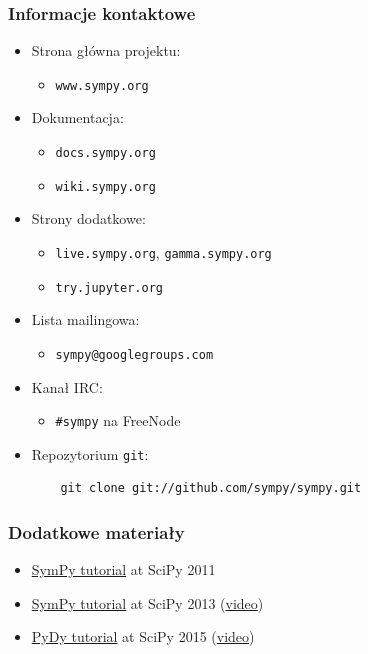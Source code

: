 \documentclass[10pt]{beamer}
\begin{document}
\begin{frame}[fragile]
  \frametitle{Informacje kontaktowe}

  \begin{itemize}
    \item Strona główna projektu:
      \begin{itemize}
        \item \texttt{www.sympy.org}
      \end{itemize}
    \item Dokumentacja:
      \begin{itemize}
        \item \texttt{docs.sympy.org}
        \item \texttt{wiki.sympy.org}
      \end{itemize}
    \item Strony dodatkowe:
      \begin{itemize}
        \item \texttt{live.sympy.org}, \texttt{gamma.sympy.org}
        \item \texttt{try.jupyter.org}
      \end{itemize}
    \item Lista mailingowa:
      \begin{itemize}
        \item \texttt{sympy@googlegroups.com}
      \end{itemize}
    \item Kanał IRC:
      \begin{itemize}
        \item \texttt{\#sympy} na FreeNode
      \end{itemize}
    \item Repozytorium \texttt{git}:
    \begin{verbatim}
    git clone git://github.com/sympy/sympy.git
    \end{verbatim}
  \end{itemize}
\end{frame}

\begin{frame}[fragile]
  \frametitle{Dodatkowe materiały}

  \begin{itemize}
    \item \href{http://mattpap.github.com/scipy-2011-tutorial/html/index.html}{SymPy tutorial} at SciPy 2011
    \item \href{http://certik.github.io/scipy-2013-tutorial/html/index.html}{SymPy tutorial} at SciPy 2013 (\href{https://www.youtube.com/watch?v=dAgShwIx72c}{video})
    \item \href{https://github.com/pydy/pydy-tutorial-human-standing}{PyDy tutorial} at SciPy 2015 (\href{https://www.youtube.com/watch?v=mdo2NYtA-xY}{video})
  \end{itemize}
\end{frame}
\end{document}
